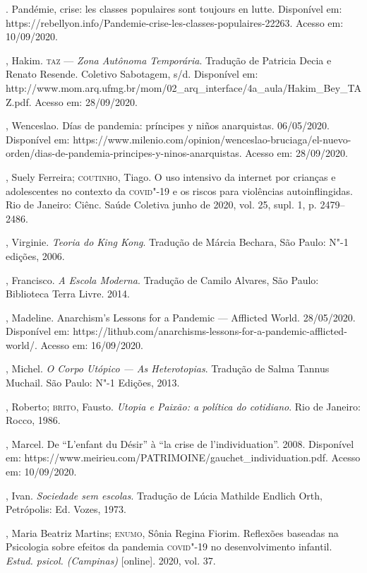 \begin{bibliohedra}
. Pandémie, crise: les classes populaires
sont toujours en lutte. Disponível em:
https://rebellyon.info/Pandemie-crise-les-classes-populaires-22263.
Acesso em: 10/09/2020.

, Hakim. \textsc{taz} --- \emph{Zona Autônoma Temporária}. Tradução de
Patricia Decia e Renato Resende. Coletivo Sabotagem, s/d. Disponível em:
http://www.mom.arq.ufmg.br/mom/02\_arq\_interface/4a\_aula/Hakim\_Bey\_TAZ.pdf.
Acesso em: 28/09/2020.

, Wenceslao. Días de pandemia: príncipes y niños anarquistas.
06/05/2020. Disponível em:
https://www.milenio.com/opinion/wenceslao-bruciaga/el-nuevo-orden/dias-de-pandemia-principes-y-ninos-anarquistas.
Acesso em: 28/09/2020.

, Suely Ferreira; \textsc{coutinho}, Tiago. O uso intensivo da internet
por crianças e adolescentes no contexto da \textsc{covid}"-19 e os riscos para
violências autoinflingidas. Rio de Janeiro: Ciênc. Saúde Coletiva junho
de 2020, vol. 25, supl. 1, p. 2479--2486.

, Virginie. \emph{Teoria do King Kong}. Tradução de Márcia
Bechara, São Paulo: N"-1 edições, 2006.

, Francisco. \emph{A Escola Moderna}. Tradução de Camilo
Alvares, São Paulo: Biblioteca Terra Livre. 2014.

, Madeline. Anarchism's Lessons for a Pandemic --- Afflicted
World. 28/05/2020. Disponível em:
https://lithub.com/anarchisms-lessons-for-a-pandemic-afflicted-world/.
Acesso em: 16/09/2020.

, Michel. \emph{O Corpo Utópico --- As Heterotopias}. Tradução
de Salma Tannus Muchail. São Paulo: N"-1 Edições, 2013.

, Roberto; \textsc{brito}, Fausto. \emph{Utopia e Paixão: a política do
cotidiano}. Rio de Janeiro: Rocco, 1986.

, Marcel. De ``L'enfant du Désir'' à ``la crise de
l'individuation''. 2008. Disponível em:
https://www.meirieu.com/PATRIMOINE/gauchet\_individuation.pdf. Acesso
em: 10/09/2020.

, Ivan. \emph{Sociedade sem escolas}. Tradução de Lúcia Mathilde
Endlich Orth, Petrópolis: Ed. Vozes, 1973.

, Maria Beatriz Martins; \textsc{enumo}, Sônia Regina Fiorim. Reflexões
baseadas na Psicologia sobre efeitos da pandemia \textsc{covid}"-19 no
desenvolvimento infantil. \emph{Estud. psicol. (Campinas)} {[}online{]}.
2020, vol. 37.


\end{bibliohedra}
